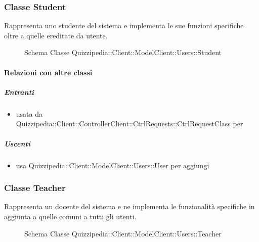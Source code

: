 \subsubsection{Classe Student}
Rappresenta uno studente del sistema e implementa le sue funzioni specifiche oltre a quelle ereditate da utente.
\begin{figure}[H]
\centering
\noindent{}
\caption[Schema Classe Student]{Schema Classe Quizzipedia::Client::ModelClient::Users::Student}
\end{figure}
\paragraph{Relazioni con altre classi}
\subparagraph{Entranti}
\begin{itemize}
\item usata da Quizzipedia::Client::ControllerClient::CtrlRequests::CtrlRequestClass per 
\end{itemize}
\subparagraph{Uscenti}
\begin{itemize}
\item usa Quizzipedia::Client::ModelClient::Users::User per aggiungi
\end{itemize}
\subsubsection{Classe Teacher}
Rappresenta un docente del sistema e ne implementa le funzionalità specifiche in aggiunta a quelle comuni a tutti gli utenti.
\begin{figure}[H]
\centering
\noindent{}
\caption[Schema Classe Teacher]{Schema Classe Quizzipedia::Client::ModelClient::Users::Teacher}
\end{figure}
